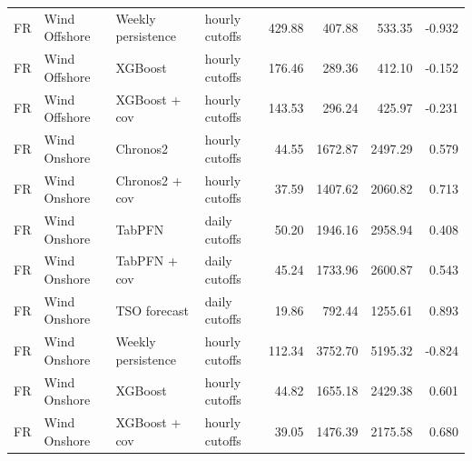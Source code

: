 \begin{longtable}{llllrrrr}
FR & Wind Offshore & Weekly persistence & hourly cutoffs & 429.88 & 407.88 & 533.35 & -0.932 \\
FR & Wind Offshore & XGBoost & hourly cutoffs & 176.46 & 289.36 & 412.10 & -0.152 \\
FR & Wind Offshore & XGBoost + cov & hourly cutoffs & 143.53 & 296.24 & 425.97 & -0.231 \\
FR & Wind Onshore & Chronos2 & hourly cutoffs & 44.55 & 1672.87 & 2497.29 & 0.579 \\
FR & Wind Onshore & Chronos2 + cov & hourly cutoffs & 37.59 & 1407.62 & 2060.82 & 0.713 \\
FR & Wind Onshore & TabPFN & daily cutoffs & 50.20 & 1946.16 & 2958.94 & 0.408 \\
FR & Wind Onshore & TabPFN + cov & daily cutoffs & 45.24 & 1733.96 & 2600.87 & 0.543 \\
FR & Wind Onshore & TSO forecast & daily cutoffs & 19.86 & 792.44 & 1255.61 & 0.893 \\
FR & Wind Onshore & Weekly persistence & hourly cutoffs & 112.34 & 3752.70 & 5195.32 & -0.824 \\
FR & Wind Onshore & XGBoost & hourly cutoffs & 44.82 & 1655.18 & 2429.38 & 0.601 \\
FR & Wind Onshore & XGBoost + cov & hourly cutoffs & 39.05 & 1476.39 & 2175.58 & 0.680 \\
\end{longtable}
